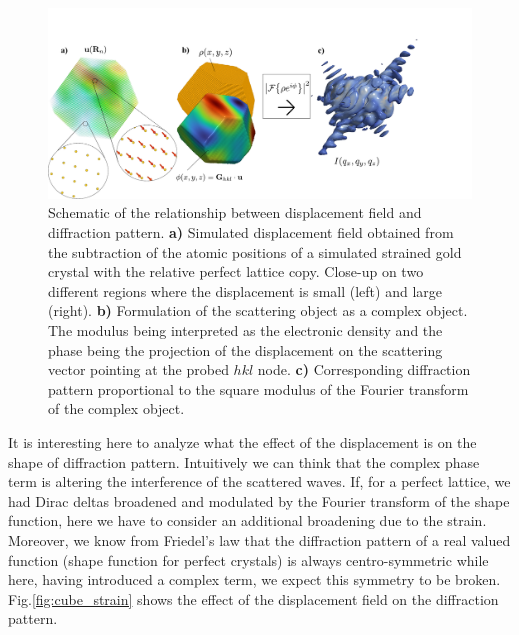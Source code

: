 \begin{figure}[H]
    \centering
    \includegraphics[width=\textwidth]{figures/Intro/displacement.pdf}
    \caption{Schematic of the relationship between displacement field and diffraction pattern. \textbf{a)} Simulated 
    displacement field obtained from the subtraction of the atomic positions of a simulated strained gold crystal with 
    the relative perfect lattice copy. Close-up on two different regions where the displacement is small (left) and large (right). 
    \textbf{b)} Formulation of the scattering object as a complex object. The modulus being interpreted as the electronic 
    density and the phase being the projection of the displacement on the scattering vector pointing at the probed $hkl$ node. 
    \textbf{c)} Corresponding diffraction pattern proportional to the square modulus of the Fourier transform of the complex object.}
    \label{fig:displacement}
\end{figure}

It is interesting here to analyze what the effect of the displacement is on the shape of diffraction pattern. Intuitively 
we can think that the complex phase term is altering the interference of the scattered waves. If, for a perfect lattice, we 
had Dirac deltas broadened and modulated by the Fourier transform of the shape function, here we have to consider an additional 
broadening due to the strain. Moreover, we know from Friedel's law \cite{Friedel} that the diffraction pattern of a 
real valued function (shape function 
for perfect crystals) is always centro-symmetric while here, having introduced a complex term, we expect this symmetry to be broken. 
Fig.\ref{fig:cube_strain} shows the effect of the displacement field on the diffraction pattern. 

